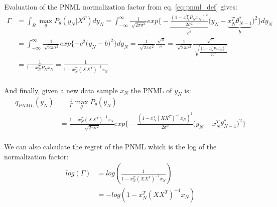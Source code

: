\documentclass[letterpaper, 10 pt, conference]{ieeeconf}  %
\begin{document}
Evaluation of the PNML normalization factor from eq. \ref{eq:pnml_def}  gives:
\begin{equation}
\begin{split}
\Gamma &=\int_R \max_{\theta} P_\theta(y_N|X^T)dy_N =\int_{-\infty}^{\infty} \frac{1}{\sqrt[]{2\pi\sigma^2}}
exp\bigg\{-\underbrace{\frac{(1 - x_N^T P_N x_N )^2 }{2\sigma^2}}_{c^2}
\bigg(y_N-\underbrace{x_N^T \theta^*_{N-1}}_{b}\bigg)^2\bigg\} dy_N\\ 
&=\int_{-\infty}^{\infty} \frac{1}{\sqrt[]{2\pi\sigma^2}}
exp\{-c^2\big(y_N-b\big)^2\} dy_N 
=\frac{1}{\sqrt[]{2\pi\sigma^2}} \frac{\sqrt[]{\pi}}{c} 
=\frac{1}{\sqrt[]{2\pi\sigma^2}} \frac{\sqrt[]{\pi}}{\sqrt[]{\frac{(1 - x_N^T P_N x_N )^2 }{2\sigma^2}}}  \\
&=\frac{1}{1 - x_N^T P_N x_N } 
=\frac{1}{1 - x_N^T (XX^T)^{-1} x_N } \\
\end{split}
\end{equation}

And finally, given a new data sample $x_N$ the PNML of $y_N$ is:
\begin{equation}
\begin{split}
q_{PNML}(y_N)
&=\frac{1}{\Gamma}\max_{\theta}P_{\theta}(y_N) \\
&=\frac{1 - x_N^T (XX^T)^{-1} x_N }{\sqrt[]{2\pi\sigma^2}}
exp\bigg\{-\frac{(1 - x_N^T (XX^T)^{-1} x_N )^2 }{2\sigma^2}\bigg(y_N-x_N^T \theta^*_{N-1} \bigg)^2\bigg\} \\
\end{split}
\end{equation}


We can also calculate the regret of the PNML which is the log of the normalization factor:
\begin{equation} \label{eq:regret}
\begin{split}
log(\Gamma)
&=log\left(\frac{1}{1 - x_N^T (XX^T)^{-1} x_N } \right) \\
&= -log(1 - x_N^T (XX^T)^{-1} x_N) 
\end{split}
\end{equation}
\end{document}
